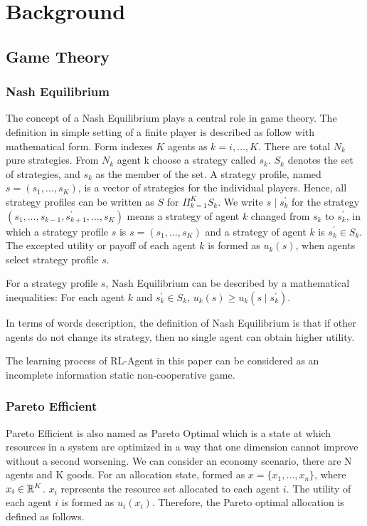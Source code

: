 \chapter{Background} \label{Chapter:Background}

\section{Game Theory}

\subsection{Nash Equilibrium}
The concept of a Nash Equilibrium plays a central role in game theory. The definition in simple setting of a finite player is described as follow with mathematical form. Form indexes $K$ agents as $k=i, \dots, K$. There are total $N_k$ pure strategies. From $N_k$ agent k choose a strategy called $s_k$. $S_k$ denotes the set of strategies, and $s_k$ as the member of the set. A strategy profile, named $s = (s_1, ..., s_K)$, is a vector of strategies for the individual players. Hence, all strategy profiles can be written as $S$ for $\Pi_{k=1}^{K} S_{k}$. We write $s \mid s_{k}^{\prime}$ for the strategy $\left(s_{1}, \ldots, s_{k-1}, s_{k+1}^{\prime}, \ldots, s_{K}\right)$ means a strategy of agent $k$ changed from $s_k$ to $s_{k}^{\prime}$, in which a strategy profile $s$ is $s = (s_1, ..., s_K)$ and a strategy of agent $k$ is $s_{k}^{\prime} \in S_{k}$. The excepted utility or payoff of each agent $k$ is formed as $u_k(s)$, when agents select strategy profile $s$\parencite{Kreps1989}.
\begin{proposition}
For a strategy profile $s$, Nash Equilibrium can be described by a mathematical inequalities: For each agent $k$ and $s_{k}^{\prime} \in S_{k}$, $u_{k}(s) \geqslant u_{k}\left(s \mid s_{k}^{\prime}\right)$.
\end{proposition}
In terms of words description, the definition of Nash Equilibrium is that if other agents do not change its strategy, then no single agent can obtain higher utility. 

The learning process of RL-Agent in this paper can be considered as an incomplete information static non-cooperative game.
 
\subsection{Pareto Efficient}
Pareto Efficient is also named as Pareto Optimal which is a state at which resources in a system are optimized in a way that one dimension cannot improve without a second worsening. We can consider an economy scenario, there are N agents and K goods. For an allocation state, formed as $x=\{x_1, \dots, x_n\}$, where $x_i \in \mathbb{R}^{K}$. $x_i$ represents the resource set allocated to each agent $i$. The utility of each agent $i$ is formed as $u_i(x_i)$. Therefore, the Pareto optimal allocation is defined as follows.

